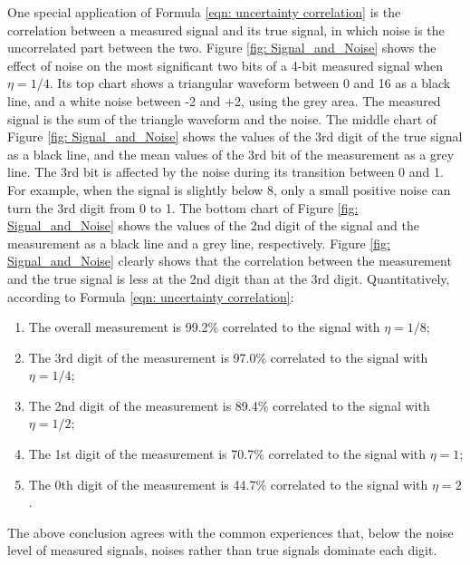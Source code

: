 \documentclass[twoside]{article}
\numberwithin{equation}{section}
\begin{document}
One special application of Formula \eqref{eqn: uncertainty correlation} is the correlation between a measured signal and its true signal, in which noise is the uncorrelated part between the two.  
Figure \ref{fig: Signal_and_Noise} shows the effect of noise on the most significant two bits of a 4-bit measured signal when $\eta=1/4$.  
Its top chart shows a triangular waveform between 0 and 16 as a black line, and a white noise between -2 and +2, using the grey area.  
The measured signal is the sum of the triangle waveform and the noise.  
The middle chart of Figure \ref{fig: Signal_and_Noise} shows the values of the 3rd digit of the true signal as a black line, and the mean values of the 3rd bit of the measurement as a grey line.  
The 3rd bit is affected by the noise during its transition between 0 and 1.  
For example, when the signal is slightly below 8, only a small positive noise can turn the 3rd digit from 0 to 1.  
The bottom chart of Figure \ref{fig: Signal_and_Noise} shows the values of the 2nd digit of the signal and the measurement as a black line and a grey line, respectively.  
Figure \ref{fig: Signal_and_Noise} clearly shows that the correlation between the measurement and the true signal is less at the 2nd digit than at the 3rd digit.  
Quantitatively, according to Formula \eqref{eqn: uncertainty correlation}:

\begin{enumerate}
\item  The overall measurement is 99.2\% correlated to the signal with $\eta=1/8$;
\item  The 3rd digit of the measurement is 97.0\% correlated to the signal with $\eta=1/4$;
\item  The 2nd digit of the measurement is 89.4\% correlated to the signal with $\eta=1/2$;
\item  The 1st digit of the measurement is 70.7\% correlated to the signal with $\eta=1$;
\item  The 0th digit of the measurement is 44.7\% correlated to the signal with $\eta=2$.
\end{enumerate}
The above conclusion agrees with the common experiences that, below the noise level of measured signals, noises rather than true signals dominate each digit.  
\end{document}
